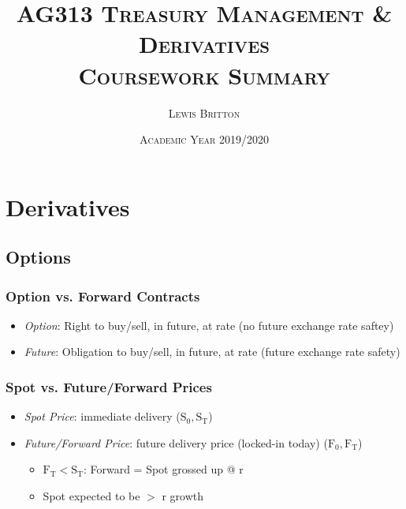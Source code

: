 \documentclass[11pt, english]{article}
\begin{document}

        \title{\textsc{AG313 Treasury Management \& Derivatives\\ Coursework Summary}}
        \author{\textsc{Lewis Britton}}
        \date{\textsc{Academic Year 2019/2020}}
        \maketitle

\newpage


        \renewcommand{\contentsname}{Table of Contents}

        \tableofcontents

\newpage


\section{Derivatives}

	\subsection{Options}

		\subsubsection{Option vs. Forward Contracts}

	\begin{itemize}
	\setlength\itemsep{0cm}
		\item \textit{Option}: Right to buy/sell, in future, at rate (no future exchange rate saftey)
		\item \textit{Future}: Obligation to buy/sell, in future, at rate (future exchange rate safety)
	\end{itemize}

		\subsubsection{Spot vs. Future/Forward Prices}

	\begin{itemize}
        \setlength\itemsep{0cm}
		\item \textit{Spot Price}: immediate delivery ($\mathrm{S_0,S_T}$)
		\item \textit{Future/Forward Price}: future delivery price (locked-in today) ($\mathrm{F_0,F_T}$)
		\begin{itemize}
			\item $\mathrm{F_T<S_T}$: Forward = Spot grossed up @ r
			\item Spot expected to be $>$ r growth
		\end{itemize}
	\end{itemize}
\end{document}
